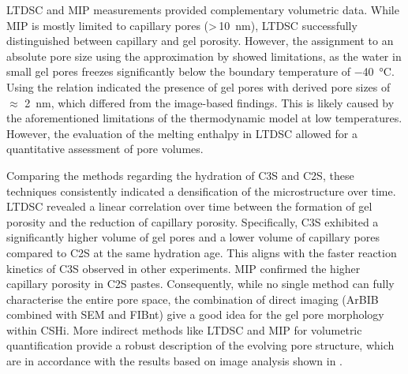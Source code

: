 \ac{LTDSC} and \ac{MIP} measurements provided complementary volumetric data.
While \ac{MIP} is mostly limited to capillary pores (>\,\qty{10}{\nano\meter}), \ac{LTDSC} successfully distinguished between capillary and gel porosity.
However, the assignment to an absolute pore size using the approximation by \textcite{brun.1977} showed limitations, as the water in small gel pores freezes significantly below the boundary temperature of \qty{-40}{\degreeCelsius}.
Using the \textcite{brun.1977} relation indicated the presence of gel pores with derived pore sizes of $\approx$ \qty{2}{\nano\meter}, which differed from the image-based findings.
This is likely caused by the aforementioned limitations of the thermodynamic model at low temperatures.
However, the evaluation of the melting enthalpy in \ac{LTDSC} allowed for a quantitative assessment of pore volumes.

Comparing the methods regarding the hydration of \ac{C3S} and \ac{C2S}, these techniques consistently indicated a densification of the microstructure over time.
\ac{LTDSC} revealed a linear correlation over time between the formation of gel porosity and the reduction of capillary porosity.
Specifically, \ac{C3S} exhibited a significantly higher volume of gel pores and a lower volume of capillary pores compared to \ac{C2S} at the same hydration age.
This aligns with the faster reaction kinetics of \ac{C3S} observed in other experiments.
\ac{MIP} confirmed the higher capillary porosity in \ac{C2S} pastes.
Consequently, while no single method can fully characterise the entire pore space, the combination of direct imaging (\ac{ArBIB} combined with \ac{SEM} and \ac{FIBnt}) give a good idea for the gel pore morphology within \ac*{CSHi}.
More indirect methods like \ac{LTDSC} and \ac{MIP} for volumetric quantification provide a robust description of the evolving pore structure, which are in accordance with the results based on image analysis shown in .
